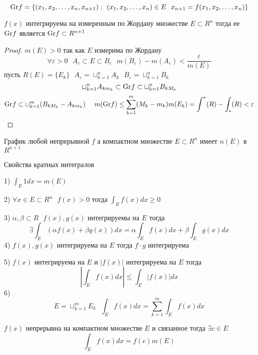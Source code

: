 \begin{define}
  $$
  \mathrm{Gr} f = \{ (x_1, x_2, \ldots, x_n, x_{n+1}): ~ (x_1, x_2, \ldots, x_n) \in E
  ~~ x_{n+1} = f(x_1, x_2, \ldots, x_n) \}
  $$
\end{define}
\begin{theorem}
  $f(x)$ интегрируема на измеренным по Жордану множестве $E \subset R^n$ тогда
  ее $\mathrm{Gr} f$ является $\mathrm{Gr} f \subset R^{n+1}$
\end{theorem}

\begin{proof}
  $m(E) > 0$ так как $E$ измерима по Жордану
  $$
  \forall \varepsilon > 0 ~~~ A_{\varepsilon} \subset E \subset B_{\varepsilon}
  ~~~ m(B_{\varepsilon}) - m(A_{\varepsilon}) < \frac{\varepsilon}{m(E)}
  $$
  пусть $R(E) = \{E_k\} ~~~ A_{\varepsilon} = \sqcup_{k=1}^n A_k ~~~
  B_{\varepsilon} = \sqcup_{k=1}^n B_k$
  $$
  \sqcup_{k=1}^n A_{k m_k} \subset \mathrm{Gr} f \subset \sqcup_{k=1}^n B_{k M_k}
  $$
  $$
  \mathrm{Gr} f \subset \sqcup_{k=1}^m (B_{k M_k} - A_{k m_k}) ~~~~
  m(\mathrm{Gr} f) \le \sum_{k=1}^m (M_k - m_k)m(E_k) =
  \int^* (R) - \int_* (R) < \varepsilon
  $$
\end{proof}

\begin{block}[Следствие]
  График любой непрерывной $f$ а компактном множестве $E \subset R^n$ имеет
  $n(E)$ в $R^{n+1}$
\end{block}

\begin{title}[\Large]
  Свойства кратных интегралов
\end{title}

\begin{block}[Свойства]
  1) $\int_E 1 dx = m(E)$

  2) $\forall x \in E \subset R^n ~~~ f(x) > 0$ тогда $\int_E f(x) dx \ge 0$

  3) $\alpha, \beta \subset R ~~~ f(x), g(x)$ интегрируемы на $E$ тогда
  $$
  \exists \int_E (\alpha f(x) + \beta g(x)) dx = \alpha \int_E f(x)dx +
  \beta \int_E g(x) dx
  $$
  4) $f(x), g(x)$ интегрируема на $E$ тогда $f \cdot g$ интегрируема

  5) $f(x)$ интегрируема на $E$ и $|f(x)|$ интегрируема на $E$ тогда
  $$
  \left| \int_E f(x) dx \right| \le \int_E |f(x)|dx
  $$
  6)
  $$
  E = \sqcup_{k=1}^m E_k ~~~ \int_E f(x) dx = \sum_{k=1}^m \int_E f(x) dx
  $$
\end{block}

\begin{theorem}[о среднем]
  $f(x)$ непрерывна на компактном множестве $E$ и связанное тогда
  $\exists c \in E$
  $$
  \int_E f(x)dx = f(c) m(E)
  $$
\end{theorem}

